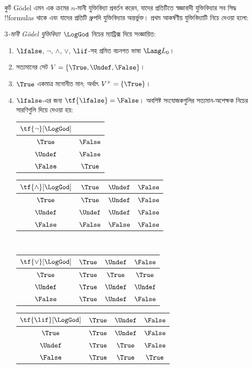 \documentclass[../../../include/open-logic-section]{subfiles}
\begin{document}


কুর্ট G\"odel এমন এক ক্রমের $n$-মানী যুক্তিবিদ্যা প্রবর্তন করেন, যাদের
প্রতিটিতে স্বজ্ঞাবাদী যুক্তিবিদ্যার সব সিদ্ধ !!{formula}s থাকে এবং যাদের
প্রতিটি ধ্রুপদি যুক্তিবিদ্যার অন্তর্ভুক্ত। প্রথম আকর্ষণীয় যুক্তিবিদ্যাটি
নিচে দেওয়া হলো:

\begin{defn}
\emph{$3$-মানী G\"odel যুক্তিবিদ্যা}~$\LogGod$ নিচের ম্যাট্রিক্স দিয়ে
সংজ্ঞায়িত:
\begin{enumerate}
  \item $\lfalse$, $\lnot$, $\land$, $\lor$, $\lif$-সহ প্রমিত বচনগত
  ভাষা $\Lang L_0$।
  \item সত্যমানের সেট $V = \{\True, \Undef, \False\}$।
  \item $\True$ একমাত্র মনোনীত মান; অর্থাৎ $V^+ = \{\True\}$।
  \item $\lfalse$-এর জন্য $\tf{\lfalse} = \False$। অবশিষ্ট সংযোজকগুলির
  সত্যমান-অপেক্ষক নিচের সারণিগুলি দিয়ে দেওয়া হয়:
  \begin{center}
    \begin{tabular}{c|c}
      $\tf{\lnot}[\LogGod]$ & \\
      \hline
      $\True$ & $\False$ \\
      $\Undef$ & $\False$ \\
      $\False$ & $\True$
    \end{tabular}
    \quad
    \begin{tabular}{c|ccc}
      $\tf{\land}[\LogGod]$ & $\True$ & $\Undef$ & $\False$ \\
      \hline
      $\True$ & $\True$ & $\Undef$ & $\False$ \\
      $\Undef$ & $\Undef$ & $\Undef$ & $\False$\\
      $\False$ & $\False$ & $\False$ & $\False$
    \end{tabular}
    \\[2ex]
    \begin{tabular}{c|ccc}
      $\tf{\lor}[\LogGod]$ & $\True$ & $\Undef$ & $\False$ \\
      \hline
      $\True$ & $\True$ & $\True$ & $\True$ \\
      $\Undef$ & $\True$ & $\Undef$ & $\Undef$ \\
      $\False$ & $\True$ & $\Undef$ & $\False$
    \end{tabular}
    \quad
    \begin{tabular}{c|ccc}
      $\tf{\lif}[\LogGod]$ & $\True$ & $\Undef$ & $\False$ \\
      \hline
      $\True$ & $\True$ & $\Undef$ & $\False$ \\
      $\Undef$ & $\True$ & $\True$ & $\False$  \\
      $\False$ & $\True$ & $\True$ & $\True$
    \end{tabular}
  \end{center}
\end{enumerate}
\end{defn}
\end{document}
